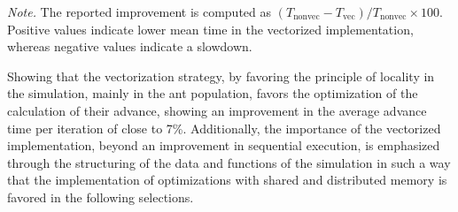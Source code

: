 \begin{table}[!htbp]
\centering
\caption{Percentage improvement in mean per-iteration times of the vectorized implementation with respect to the non-vectorized implementation for 1 thread and 5000 ants.}
\label{tab:vectorization_improvement_threads1_ants5000}
\scriptsize
\setlength{\tabcolsep}{2.8pt}
\renewcommand{\arraystretch}{1.08}
\par\vspace{2pt}\parbox{\columnwidth}{\raggedright\footnotesize\textit{Note.} The reported improvement is computed as $(T_{\text{nonvec}} - T_{\text{vec}})/T_{\text{nonvec}} \times 100$. Positive values indicate lower mean time in the vectorized implementation, whereas negative values indicate a slowdown.}
\end{table}

Showing that the vectorization strategy, by favoring the principle of locality in the simulation, mainly in the ant population, favors the optimization of the calculation of their advance, showing an improvement in the average advance time per iteration of close to 7\%. Additionally, the importance of the vectorized implementation, beyond an improvement in sequential execution, is emphasized through the structuring of the data and functions of the simulation in such a way that the implementation of optimizations with shared and distributed memory is favored in the following selections.
